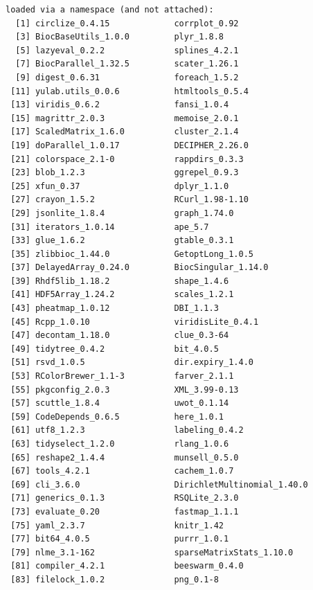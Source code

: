 \documentclass[
]{book}
\begin{document}
\begin{verbatim}
loaded via a namespace (and not attached):
  [1] circlize_0.4.15             corrplot_0.92              
  [3] BiocBaseUtils_1.0.0         plyr_1.8.8                 
  [5] lazyeval_0.2.2              splines_4.2.1              
  [7] BiocParallel_1.32.5         scater_1.26.1              
  [9] digest_0.6.31               foreach_1.5.2              
 [11] yulab.utils_0.0.6           htmltools_0.5.4            
 [13] viridis_0.6.2               fansi_1.0.4                
 [15] magrittr_2.0.3              memoise_2.0.1              
 [17] ScaledMatrix_1.6.0          cluster_2.1.4              
 [19] doParallel_1.0.17           DECIPHER_2.26.0            
 [21] colorspace_2.1-0            rappdirs_0.3.3             
 [23] blob_1.2.3                  ggrepel_0.9.3              
 [25] xfun_0.37                   dplyr_1.1.0                
 [27] crayon_1.5.2                RCurl_1.98-1.10            
 [29] jsonlite_1.8.4              graph_1.74.0               
 [31] iterators_1.0.14            ape_5.7                    
 [33] glue_1.6.2                  gtable_0.3.1               
 [35] zlibbioc_1.44.0             GetoptLong_1.0.5           
 [37] DelayedArray_0.24.0         BiocSingular_1.14.0        
 [39] Rhdf5lib_1.18.2             shape_1.4.6                
 [41] HDF5Array_1.24.2            scales_1.2.1               
 [43] pheatmap_1.0.12             DBI_1.1.3                  
 [45] Rcpp_1.0.10                 viridisLite_0.4.1          
 [47] decontam_1.18.0             clue_0.3-64                
 [49] tidytree_0.4.2              bit_4.0.5                  
 [51] rsvd_1.0.5                  dir.expiry_1.4.0           
 [53] RColorBrewer_1.1-3          farver_2.1.1               
 [55] pkgconfig_2.0.3             XML_3.99-0.13              
 [57] scuttle_1.8.4               uwot_0.1.14                
 [59] CodeDepends_0.6.5           here_1.0.1                 
 [61] utf8_1.2.3                  labeling_0.4.2             
 [63] tidyselect_1.2.0            rlang_1.0.6                
 [65] reshape2_1.4.4              munsell_0.5.0              
 [67] tools_4.2.1                 cachem_1.0.7               
 [69] cli_3.6.0                   DirichletMultinomial_1.40.0
 [71] generics_0.1.3              RSQLite_2.3.0              
 [73] evaluate_0.20               fastmap_1.1.1              
 [75] yaml_2.3.7                  knitr_1.42                 
 [77] bit64_4.0.5                 purrr_1.0.1                
 [79] nlme_3.1-162                sparseMatrixStats_1.10.0   
 [81] compiler_4.2.1              beeswarm_0.4.0             
 [83] filelock_1.0.2              png_0.1-8                  

\end{verbatim}
\end{document}
